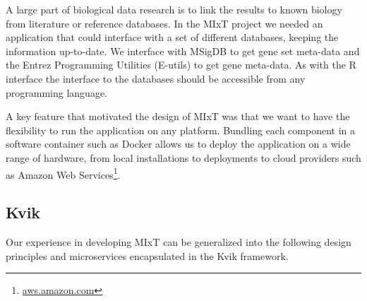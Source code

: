 A large part of biological data research is to link the results to known biology
from literature or reference databases. In the MIxT project we needed an
application that could interface with a set of different databases, keeping the
information up-to-date. We interface with MSigDB to get gene set meta-data and
the Entrez Programming Utilities (E-utils) to get gene meta-data. 
As with the R interface the interface to the databases
should be accessible from any programming language. 





A key feature that motivated the design of MIxT was that we want to
have the flexibility to run the application on any platform. Bundling each
component in a software container such as Docker allows us to deploy the
application on a wide range of hardware, from local installations to deployments
to cloud providers such as Amazon Web Services\footnote{\url{aws.amazon.com}}.

\subsection*{Kvik}
Our experience in developing MIxT can be generalized into the following design
principles and microservices encapsulated in the Kvik framework. 

